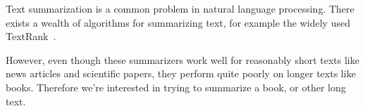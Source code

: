 Text summarization is a common problem in natural language processing. There
exists a wealth of algorithms for summarizing text, for example the
widely used TextRank~\cite{mihalcea2004textrank}.

However, even though these summarizers work well for reasonably short texts
like news articles and scientific papers, they perform quite poorly on longer texts like books.
Therefore we're interested in trying to summarize a book, or other long text.